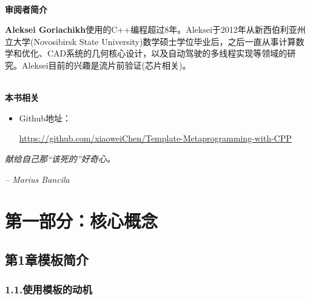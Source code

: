\documentclass[11pt,a4paper,UTF8]{book}
\begin{document}
\begin{sloppypar}
		\hspace*{\fill} \\ %
		\noindent\textbf{审阅者简介}
	
		\textbf{Aleksei Goriachikh}使用的C++编程超过8年。Aleksei于2012年从新西伯利亚州立大学(Novosibirsk State University)数学硕士学位毕业后，之后一直从事计算数学和优化、CAD系统的几何核心设计，以及自动驾驶的多线程实现等领域的研究。Aleksei目前的兴趣是流片前验证(芯片相关)。
		
		\hspace*{\fill} \\ %
		\noindent\textbf{本书相关}
		\begin{itemize}
			\item Github地址：
			
			\url{https://github.com/xiaoweiChen/Template-Metaprogramming-with-CPP}
		\end{itemize}
		\newpage
		
		\vspace*{\fill}
		\begin{center}
		\textit{献给自己那“该死的”好奇心。}
		
		\textit{– Marius Bancila}
		\end{center}
		\vspace*{\fill}
		\newpage
		
		\pagestyle{empty}
		
		\newpage
		
		\tableofcontents
		\newpage
		
		
		\color{white}
		\section*{第一部分：核心概念}
		\pagecolor{mygray}
		\textbf{}
		\newpage
		\color{black}
		\pagecolor{white}
		
		\subsection*{ 第1章\hspace{0.5cm}模板简介}
		
		
		\subsubsection*{ 1.1.\hspace{0.2cm}使用模板的动机}
		
		

\end{sloppypar}
\end{document}
